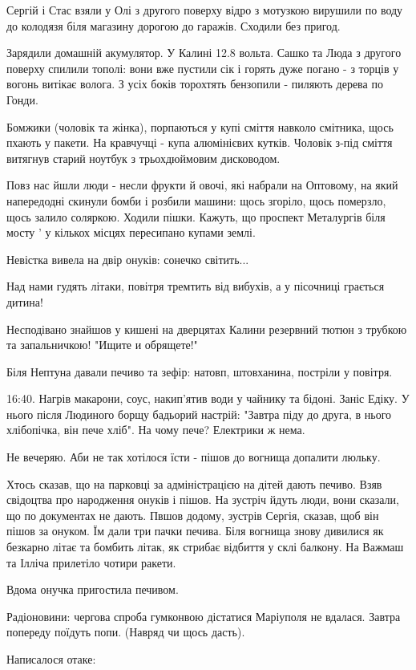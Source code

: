 Сергій і Стас взяли у Олі з другого поверху відро з мотузкою вирушили по воду
до колодязя біля магазину дорогою до гаражів. Сходили без пригод.

Зарядили домашній акумулятор. У Калині 12.8 вольта. Сашко та Люда з другого
поверху спилили тополі: вони вже пустили сік і горять дуже погано - з торців у
вогонь витікає волога. З усіх боків торохтять бензопили - пиляють дерева по
Гонди.

Бомжики (чоловік та жінка), порпаються у купі сміття навколо смітника, щось
пхають у пакети. На кравчучці - купа алюмінієвих кутків. Чоловік з-під сміття
витягнув старий ноутбук з трьохдюймовим дисководом.

Повз нас йшли люди - несли фрукти й овочі, які набрали на Оптовому, на який
напередодні скинули бомби і розбили машини: щось згоріло, щось померзло, щось
залило соляркою. Ходили пішки. Кажуть, що проспект Металургів біля мосту ' у
кількох місцях пересипано купами землі.

Невістка вивела на двір онуків: сонечко світить...

Над нами гудять літаки, повітря тремтить від вибухів, а у пісочниці грається
дитина!


Несподівано знайшов у кишені на дверцятах Калини резервний тютюн з трубкою та
запальничкою! "Ищите и обрящете!"

Біля Нептуна давали печиво та зефір: натовп, штовханина, постріли у повітря.

16:40. Нагрів макарони, соус, накип'ятив води у чайнику та бідоні. Заніс Едіку.
У нього після Людиного борщу бадьорий настрій: "Завтра піду до друга, в нього
хлібопічка, він пече хліб". На чому пече? Електрики ж нема.

Не вечеряю. Аби не так хотілося їсти - пішов до вогнища допалити люльку.

Хтось сказав, що на парковці за адміністрацією на дітей дають печиво. Взяв
свідоцтва про народження онуків і пішов. На зустріч йдуть люди, вони сказали,
що по документах не дають. Пвшов додому, зустрів Сергія, сказав, щоб він пішов
за онуком. Їм дали три пачки печива. Біля вогнища знову дивилися як безкарно
літає та бомбить літак, як стрибає відбиття у склі балкону. На Важмаш та Ілліча
прилетіло чотири ракети.

Вдома онучка пригостила печивом.

Радіоновини: чергова спроба гумконвою дістатися Маріуполя не вдалася. Завтра
попереду поїдуть попи. (Навряд чи щось дасть).

Написалося отаке:

